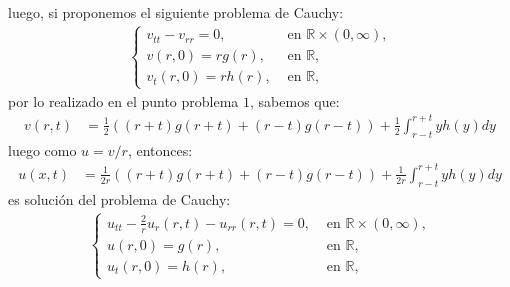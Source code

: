 \begin{homeworkProblem}
\begin{enumerate}[i)]
\begin{solucion}
\begin{align*}
        \end{align*}
        luego, si proponemos el siguiente problema de Cauchy:
        \begin{align*}
          \begin{cases}
            v_{tt}-v_{rr}=0, &\text{ en } \mathbb{R}\times (0,\infty) \text{,} \\
            v(r,0)=rg(r), &\text{ en }\mathbb{R} \text{,}\\
            v_{t}(r,0)=rh(r), &\text{ en }\mathbb{R} \text{,}
          \end{cases}
        \end{align*}
        por lo realizado en el punto problema $1$, sabemos que:
        \begin{align*}
          v(r,t)&=\frac{1}{2}((r+t)g(r+t)+(r-t)g(r-t))+\frac{1}{2}\int_{r-t}^{r+t}yh(y)dy
        \end{align*}
        luego como $u=v/r$, entonces:
        \begin{align*}
          u(x,t)&=\frac{1}{2r}((r+t)g(r+t)+(r-t)g(r-t))+\frac{1}{2r}\int_{r-t}^{r+t}yh(y)dy
        \end{align*}
        es solución del problema de Cauchy:
        \begin{align*}
          \begin{cases}
            u_{tt}-\frac{2}{r} u_r(r,t) - u_{rr}(r,t)=0, &\text{ en } \mathbb{R}\times (0,\infty) \text{,} \\
            u(r,0)=g(r), &\text{ en }\mathbb{R} \text{,}\\
            u_{t}(r,0)=h(r), &\text{ en }\mathbb{R} \text{,}
          \end{cases}
        \end{align*}
        \demostrado
      \end{solucion}
  \end{enumerate}
\end{homeworkProblem}
